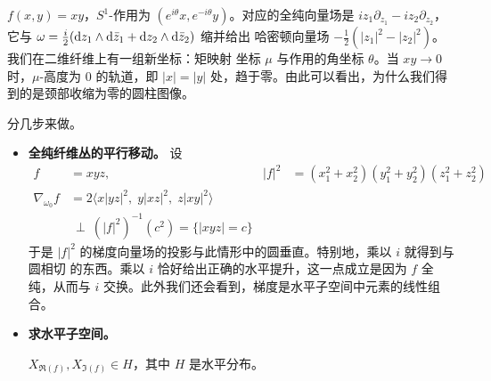 

$f(x,y)=xy$，$S^1$-作用为 $(e^{i\theta}x,e^{-i\theta}y)$。对应的全纯向量场是
$iz_1\partial_{z_1}-iz_2\partial_{z_2}$，它与
$\omega=\frac{i}{2}(\mathrm{d} z_1\wedge\mathrm{d}\bar z_1+\mathrm{d} z_2\wedge\mathrm{d}\bar z_2)$ 缩并给出
哈密顿向量场 $-\frac{1}{2}(|z_1|^2-|z_2|^2)$。我们在二维纤维上有一组新坐标：矩映射
坐标 $\mu$ 与作用的角坐标 $\theta$。当 $xy\to0$ 时，$\mu$-高度为 $0$ 的轨道，即
$|x|=|y|$ 处，趋于零。由此可以看出，为什么我们得到的是颈部收缩为零的圆柱图像。

\begin{example}[三维局部情形]\label{ex:4-1-22}
分几步来做。

\begin{itemize}[leftmargin=2.2em,itemsep=0.25em]
\item \textbf{全纯纤维丛的平行移动。} 设
\begin{equation}\label{eq:4-1}
\begin{aligned}
f&=xyz, & |f|^2&=(x_1^2+x_2^2)(y_1^2+y_2^2)(z_1^2+z_2^2)\\
\nabla_{\omega_0}f&=2\langle x|yz|^2,\;y|xz|^2,\;z|xy|^2\rangle\\
&\ \perp\ (|f|^2)^{-1}(c^2)=\{|xyz|=c\}
\end{aligned}
\end{equation}
于是 $|f|^2$ 的梯度向量场的投影与此情形中的圆垂直。特别地，乘以 $i$ 就得到与圆相切
的东西。乘以 $i$ 恰好给出正确的水平提升，这一点成立是因为 $f$ 全纯，从而与 $i$
交换。此外我们还会看到，梯度是水平子空间中元素的线性组合。


\item \textbf{求水平子空间。}
\begin{claim}\label{clm:4-1-23}
$X_{\Re(f)},X_{\Im(f)}\in H$，其中 $H$ 是水平分布。
\end{claim}


\end{itemize}
\end{example}
